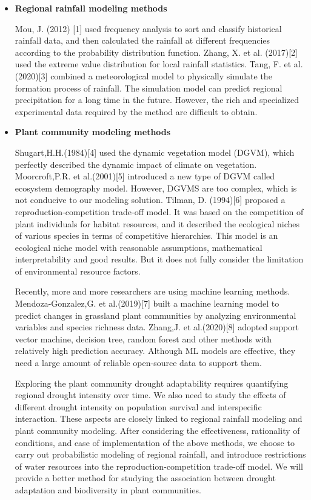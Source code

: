 \documentclass{mcmthesis}
\begin{document}
\begin{itemize}
	
	\item \textbf{Regional rainfall modeling methods}
	
	\qquad
	Mou, J. (2012) [1] used frequency analysis to sort and classify historical rainfall data, and then calculated the rainfall at different frequencies according to the probability distribution function. Zhang, X. et al. (2017)[2] used the extreme value distribution for local rainfall statistics. Tang, F. et al. (2020)[3] combined a meteorological model to physically simulate the formation process of rainfall. The simulation model can predict regional precipitation for a long time in the future. However, the rich and specialized experimental data required by the method are difficult to obtain.
	
	\item \textbf{Plant community modeling methods}
	
	\qquad
	Shugart,H.H.(1984)[4] used the dynamic vegetation model (DGVM), which perfectly described the dynamic impact of climate on vegetation. Moorcroft,P.R. et al.(2001)[5] introduced a new type of DGVM called ecosystem demography model. However, DGVMS are too complex, which is not conducive to our modeling solution. Tilman, D. (1994)[6] proposed a reproduction-competition trade-off model. It was based on the competition of plant individuals for habitat resources, and it described the ecological niches of various species in terms of competitive hierarchies. This model is an ecological niche model with reasonable assumptions, mathematical interpretability and good results. But it does not fully consider the limitation of environmental resource factors.
	
	\qquad
	Recently, more and more researchers are using machine learning methods. Mendoza-Gonzalez,G. et al.(2019)[7] built a machine learning model to predict changes in grassland plant communities by analyzing environmental variables and species richness data. Zhang,J. et al.(2020)[8] adopted support vector machine, decision tree, random forest and other methods with relatively high prediction accuracy. Although ML models are effective, they need a large amount of reliable open-source data to support them.
	
	\qquad
	Exploring the plant community drought adaptability requires quantifying regional drought intensity over time. We also need to study the effects of different drought intensity on population survival and interspecific interaction. These aspects are closely linked to regional rainfall modeling and plant community modeling. After considering the effectiveness, rationality of conditions, and ease of implementation of the above methods, we choose to carry out probabilistic modeling of regional rainfall, and introduce restrictions of water resources into the reproduction-competition trade-off model. We will provide a better method for studying the association between drought adaptation and biodiversity in plant communities.
\end{itemize}
\end{document}
